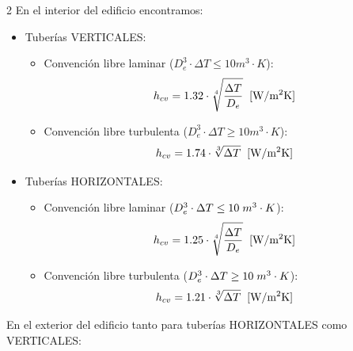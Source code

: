 \documentclass[11pt]{article}
\begin{document}
\begin{multicols*}{2}
        En el interior del edificio encontramos:

        \begin{itemize}
            \item Tuberías VERTICALES:
                \begin{itemize}
                    \item Convención libre laminar ($D_{e}^3 \cdot \Delta T \leq 10 m^3 \cdot K$): 
                    \begin{equation}
                        h_{cv} = 1.32 \cdot \sqrt[4]{\frac{\Delta T}{D_e}} \hspace{0.2cm} \text{[W/m$^2$K]}
                    \end{equation}
                    \item Convención libre turbulenta ($D_{e}^3 \cdot \Delta T \geq 10 m^3 \cdot K$): 
                    \begin{equation}
                        h_{cv} = 1.74 \cdot \sqrt[3]{\Delta T} \hspace{0.2cm} \text{[W/m$^2$K]}
                    \end{equation}
                \end{itemize}

            \item Tuberías HORIZONTALES: 
                \begin{itemize}
                    \item Convención libre laminar ($D_{e}^3 \cdot \Delta T \leq 10 \hspace {0.1cm} m^3 \cdot K$): 
                    \begin{equation}
                        h_{cv} = 1.25 \cdot \sqrt[4]{\frac{\Delta T}{D_e}} \hspace{0.2cm} \text{[W/m$^2$K]}
                    \end{equation}
                    \item Convención libre turbulenta ($D_{e}^3 \cdot \Delta T \geq 10 \hspace{0.1cm} m^3 \cdot K$): 
                    \begin{equation}
                        h_{cv} = 1.21 \cdot \sqrt[3]{\Delta T} \hspace{0.2cm} \text{[W/m$^2$K]}
                    \end{equation}
                \end{itemize}
        \end{itemize}

        En el exterior del edificio tanto para tuberías HORIZONTALES como VERTICALES:


\end{multicols*}
\end{document}

